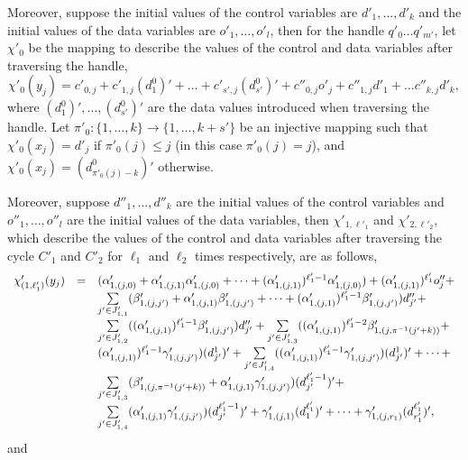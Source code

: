 \documentclass[runningheads,a4paper]{llncs}
\begin{document}
Moreover, suppose the initial values of the control variables are $d'_1,\dots,d'_k$ and the initial values of the data variables are $o'_1,\dots,o'_l$, then for the handle $q'_0 \dots q'_{m'}$, let $\chi'_0$ be the mapping to describe the values of the control and data variables after traversing the handle, 
\[
\chi'_0(y_j) = c'_{0,j} + c'_{1,j} (d^0_1)' + \dots + c'_{s',j} (d^0_{s'})'+c''_{0,j} o'_j + c''_{1,j} d'_1 + \dots c''_{k,j} d'_k,
\] 
where $(d^0_1)' ,\dots, (d^0_{s'})'$ are the data values introduced when traversing the handle. Let $\pi'_0: \{1,\dots,k\} \rightarrow \{1,\dots,k+s'\}$ be an injective mapping such that $\chi'_0(x_j) = d'_{j}$ if $\pi'_0(j) \le j$ (in this case $\pi'_0(j)=j$), and $\chi'_0(x_j) = (d^0_{\pi'_0(j)-k})'$ otherwise.


Moreover, suppose $d''_1,\dots,d''_k$ are the initial values of the control variables and $o''_1,\dots,o''_l$ are the initial values of the data variables, then $\chi'_{1,\ell'_1}$ and $\chi'_{2,\ell'_2}$, which describe the values of the control and data variables after traversing the cycle $C'_1$ and $C'_2$ for $\ell_1$ and $\ell_2$ times respectively, are as follows, 
%
\[
\begin{array}{l c l}
\chi'_{(1,\ell'_1)}(y_j)  & = & (\alpha'_{1,(j,0)} + \alpha'_{1,(j,1)} \alpha'_{1,(j,0)}+ \dots +(\alpha'_{1,(j,1)})^{\ell'_1-1} \alpha'_{1,(j,0)}) + (\alpha'_{1,(j,1)})^{\ell'_1} o''_j + \\
& & \sum \limits_{j' \in J'_{1,1}} (\beta'_{1,(j,j')}+\alpha'_{1,(j,1)}\beta'_{1,(j,j')} + \dots +(\alpha'_{1,(j,1)})^{\ell'_1-1}  \beta'_{1,(j,j')}) d''_{j'} + \\
%
& & \sum \limits_{j' \in J'_{1,2}} ( (\alpha'_{1,(j,1)})^{\ell'_1-1} \beta'_{1,(j,j')}) d''_{j'} +  \sum \limits_{j' \in J'_{1,3}} ( (\alpha'_{1,(j,1)})^{\ell'_1-2} \beta'_{1,(j, \pi^{-1}(j'+k))}+\\
%
& &  (\alpha'_{1,(j,1)})^{\ell'_1-1} \gamma'_{1,(j,j')}) (d^1_{j'})' +  \sum \limits_{j' \in J'_{1,4}} ( (\alpha'_{1,(j,1)})^{\ell'_1-1} \gamma'_{1,(j,j')}) (d^1_{j'})' + \dots +  \\
%
& & \sum \limits_{j' \in J'_{1,3}} (\beta'_{1,(j, \pi^{-1}(j'+k))}+\alpha'_{1,(j,1)}\gamma'_{1,(j,j')}) (d^{\ell'_1-1}_{j'})' +\\
& & \sum \limits_{j' \in J'_{1,4}} (\alpha'_{1,(j,1)} \gamma'_{1,(j,j')}) (d^{\ell'_1-1}_{j'})' + \gamma'_{1,(j, 1)} (d^{\ell'_1}_{1})' + \dots + \gamma'_{1,(j,r_1)} (d^{\ell'_1}_{r'_1})',
\end{array} 
\]
and
\end{document}
